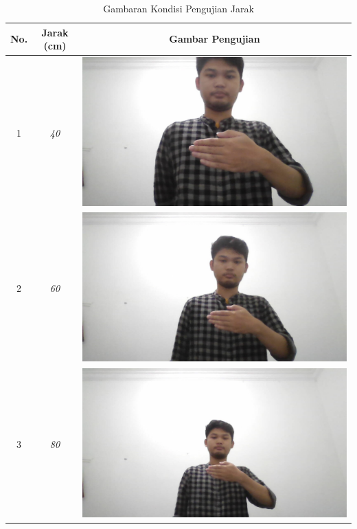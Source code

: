 \begin{longtable}{|c|c|c|}
  \caption{Gambaran Kondisi Pengujian Jarak}
  \label{tb:Gambaran Kondisi Pengujian Jarak}\\
  \hline
  \textbf{No.} & \textbf{Jarak (cm)} & \textbf{Gambar Pengujian} \\
  \hline
  \endhead
  1 & \emph{40}  &  \includegraphics[scale=0.2]{gambar/pengujian-jarak/pengambilan-data/jarak-40cm.jpg} \\
  \hline
  2 & \emph{60}  &  \includegraphics[scale=0.2]{gambar/pengujian-jarak/pengambilan-data/jarak-60cm.jpg} \\
  \hline
  3 & \emph{80}  &  \includegraphics[scale=0.2]{gambar/pengujian-jarak/pengambilan-data/jarak-80cm.jpg} \\

\end{longtable}
